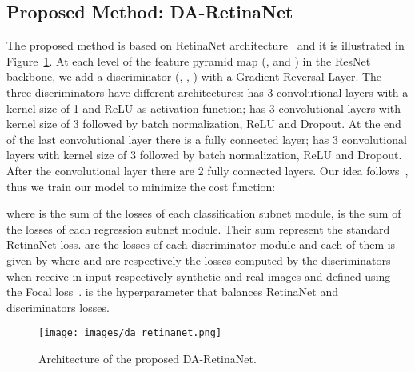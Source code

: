 \documentclass[preprint]{elsarticle}
\begin{document}
\subsection{Proposed Method: DA-RetinaNet}
\label{DAretinanet}
The proposed method is based on RetinaNet architecture~\cite{DBLP:journals/corr/abs-1708-02002} and it is illustrated in Figure~\ref{fig:DA-Retinanet}. At each level of the feature pyramid map (,  and ) in the ResNet backbone, we add a discriminator (, , ) with a Gradient Reversal Layer. The three discriminators have different architectures:  has 3 convolutional layers with a kernel size of 1 and ReLU as activation function;  has 3 convolutional layers with kernel size of 3 followed by batch normalization, ReLU and Dropout. At the end of the last convolutional layer there is a fully connected layer;  has 3 convolutional layers with kernel size of 3 followed by batch normalization, ReLU and Dropout. After the convolutional layer there are 2 fully connected layers. Our idea follows~\cite{ganin2014unsupervised}, thus we train our model to minimize the cost function:

where  is the sum of the losses of each classification subnet module,  is the sum of the losses of each regression subnet module. Their sum represent the standard RetinaNet loss.  are the losses of each discriminator module and each of them is given by  where  and  are respectively the losses computed by the discriminators when receive in input respectively synthetic and real images and defined using the Focal loss~\cite{DBLP:journals/corr/abs-1708-02002}.  is the hyperparameter that balances RetinaNet and discriminators losses. 
 \begin{figure}[t]
    \centering
	\texttt{[image: images/da\_retinanet.png]} 
	\caption{Architecture of the proposed DA-RetinaNet.}
	\label{fig:DA-Retinanet} 
\end{figure}
\end{document}
